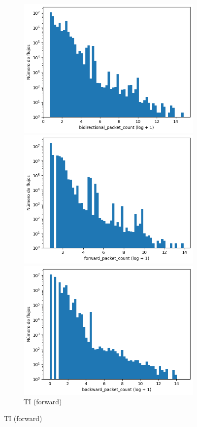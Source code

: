 \begin{figure}[H]
\begin{subfigure}[b]{0.26\textwidth}
        \includegraphics[width=\linewidth]{media/packet_pincer_toniot/bidirectional_packet_count_log_x_log_y.png}
        \caption{TI (bidir.)}
        \includegraphics[width=\textwidth]{media/packet_pincer_toniot/forward_packet_count_log_x_log_y.png}
        \caption{TI (forward)}
        \includegraphics[width=\textwidth]{media/packet_pincer_toniot/backward_packet_count_log_x_log_y.png}

\end{subfigure}
\end{figure}
